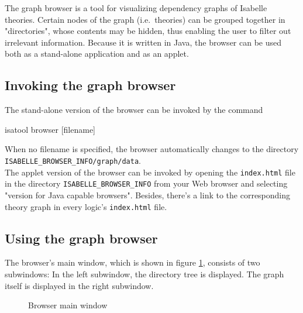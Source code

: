 The graph browser is a tool for visualizing
dependency graphs of Isabelle theories. Certain nodes of
the graph (i.e.~theories) can be grouped together in "directories",
whose contents may be hidden, thus enabling the user to filter out
irrelevant information. Because it is written in Java, the browser
can be used both as a stand-alone application and as an applet.

\subsection{Invoking the graph browser}
The stand-alone version of the browser can be invoked by the command
\begin{ttbox}
isatool browser [filename]
\end{ttbox}
When no filename is specified, the browser automatically changes to the directory
\texttt{ISABELLE_BROWSER_INFO/graph/data}.\\

The applet version of the browser can be invoked by opening the {\tt index.html} file
in the directory \texttt{ISABELLE_BROWSER_INFO} from your Web browser and selecting
"version for Java capable browsers". Besides, there's a link to the corresponding theory graph
in every logic's {\tt index.html} file.

\subsection{Using the graph browser}
The browser's main window, which is shown in figure \ref{browserwindow},
consists of two subwindows: In the left subwindow, the directory tree
is displayed. The graph itself is displayed in the right subwindow.
\begin{figure}[h]
\setlength{\epsfxsize}{\textwidth}
\caption{\label{browserwindow} Browser main window}
\end{figure}

